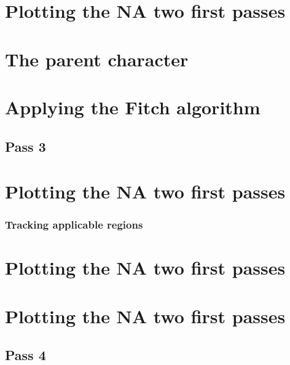\documentclass[]{book}
\theoremstyle{definition}
\theoremstyle{definition}
\theoremstyle{definition}
\theoremstyle{remark}
\begin{document}
\hypertarget{plotting-the-na-two-first-passes}{%
\section{Plotting the NA two first
passes}\label{plotting-the-na-two-first-passes}}

\hypertarget{the-parent-character}{%
\section{The parent character}\label{the-parent-character}}

\hypertarget{applying-the-fitch-algorithm-1}{%
\section{Applying the Fitch
algorithm}\label{applying-the-fitch-algorithm-1}}

\hypertarget{pass-3}{%
\subsection{Pass 3}\label{pass-3}}

\hypertarget{plotting-the-na-two-first-passes-1}{%
\section{Plotting the NA two first
passes}\label{plotting-the-na-two-first-passes-1}}

\hypertarget{tracking-applicable-regions}{%
\subsubsection{Tracking applicable
regions}\label{tracking-applicable-regions}}

\hypertarget{plotting-the-na-two-first-passes-2}{%
\section{Plotting the NA two first
passes}\label{plotting-the-na-two-first-passes-2}}

\hypertarget{plotting-the-na-two-first-passes-3}{%
\section{Plotting the NA two first
passes}\label{plotting-the-na-two-first-passes-3}}

\hypertarget{pass-4}{%
\subsection{Pass 4}\label{pass-4}}
\end{document}
